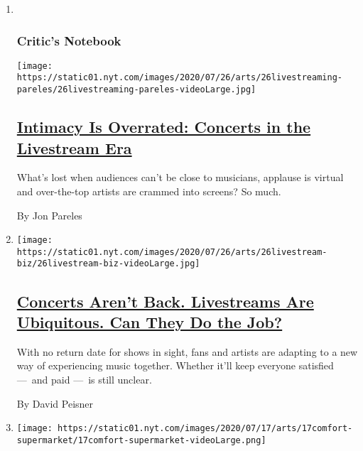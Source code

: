 \begin{enumerate}
\def\labelenumi{\arabic{enumi}.}
\item ~
  \hypertarget{critics-notebook-1}{%
  \subsubsection{Critic's Notebook}\label{critics-notebook-1}}

  \texttt{[image: https://static01.nyt.com/images/2020/07/26/arts/26livestreaming-pareles/26livestreaming-pareles-videoLarge.jpg]}

  \hypertarget{intimacy-is-overrated-concerts-in-the-livestream-era}{%
  \subsection{\texorpdfstring{\href{/2020/07/21/arts/music/livestreams-intimacy.html}{Intimacy
  Is Overrated: Concerts in the Livestream
  Era}}{Intimacy Is Overrated: Concerts in the Livestream Era}}\label{intimacy-is-overrated-concerts-in-the-livestream-era}}

  What's lost when audiences can't be close to musicians, applause is
  virtual and over-the-top artists are crammed into screens? So much.

  By Jon Pareles
\item
  \texttt{[image: https://static01.nyt.com/images/2020/07/26/arts/26livestream-biz/26livestream-biz-videoLarge.jpg]}

  \hypertarget{concerts-arent-back-livestreams-are-ubiquitous-can-they-do-the-job}{%
  \subsection{\texorpdfstring{\href{/2020/07/21/arts/music/concerts-livestreams.html}{Concerts
  Aren't Back. Livestreams Are Ubiquitous. Can They Do the
  Job?}}{Concerts Aren't Back. Livestreams Are Ubiquitous. Can They Do the Job?}}\label{concerts-arent-back-livestreams-are-ubiquitous-can-they-do-the-job}}

  With no return date for shows in sight, fans and artists are adapting
  to a new way of experiencing music together. Whether it'll keep
  everyone satisfied ---~and paid ---~is still unclear.

  By David Peisner
\item
  \texttt{[image: https://static01.nyt.com/images/2020/07/17/arts/17comfort-supermarket/17comfort-supermarket-videoLarge.png]}


\end{enumerate}
